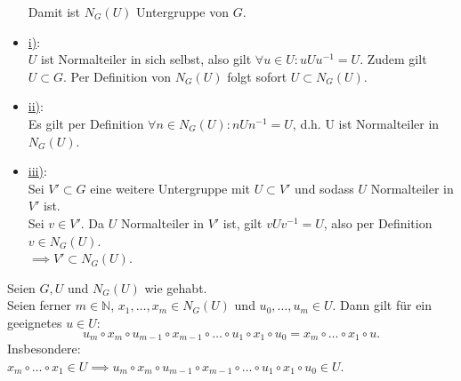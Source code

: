 \documentclass[a4paper]{article}
\newcommand{\N}{\mathbb{N}}
\begin{document}
\begin{beweis}
\begin{itemize}
        Damit ist $N_G(U)$ Untergruppe von $G$. \\
    \item \underline{i)}: \\
        $U$ ist Normalteiler in sich selbst, also gilt $\forall u \in U: u U u^{-1} = U$. Zudem gilt $U \subset G$. Per Definition von $N_G(U)$ folgt sofort $U \subset N_G(U)$. \\
    \item \underline{ii)}: \\
        Es gilt per Definition $\forall n \in N_G(U): n U n^{-1} = U$, d.h. U ist Normalteiler in $N_G(U)$. \\
    \item \underline{iii)}: \\
        Sei $V' \subset G$ eine weitere Untergruppe mit $U \subset  V'$ und sodass $U$ Normalteiler in $V'$ ist. \\
        Sei $v \in V'$. Da $U$ Normalteiler in $V'$ ist, gilt $v U v^{-1} = U$, also per Definition $v \in N_G(U)$. \\
        $\implies V' \subset N_G(U)$.
    \end{itemize}
    \end{beweis}

    \begin{satz}
        Seien $G, U$ und $N_G(U)$ wie gehabt. \\
        Seien ferner $m \in \N$, $x_1, \ldots, x_m \in N_G(U)$ und $u_0, \ldots, u_m \in U$. Dann gilt für ein geeignetes $u \in U$:
        \[
            u_m \circ x_m \circ u_{m-1} \circ x_{m-1} \circ \ldots \circ u_1 \circ x_1 \circ u_0 = x_m \circ \ldots \circ  x_1 \circ u
        .\] 
        Insbesondere: \\
        $x_m \circ \ldots \circ x_1 \in U \implies u_m \circ x_m \circ u_{m-1} \circ x_{m-1} \circ \ldots \circ u_1 \circ x_1 \circ u_0 \in U$.
    \end{satz}
\end{document}
